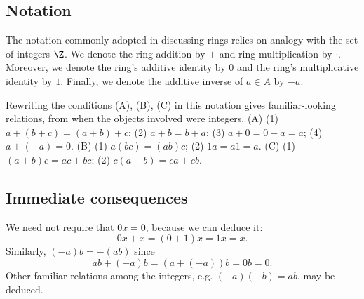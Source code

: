 \subsection*{Notation}

The notation commonly adopted in discussing rings relies on analogy with the set of integers $\Z $.
We denote the ring addition by $+$ and ring multiplication by $\cdot $.
Moreover, we denote the ring's additive identity by $0$ and the ring's multiplicative identity by $1$.
Finally, we denote the additive inverse of $a \in A$ by $-a$.

Rewriting the conditions (A), (B), (C) in this notation gives familiar-looking relations, from when the objects involved were integers.
(A) (1) $a+(b + c) = (a+b)+c$; (2) $a+b = b+a$; (3) $a + 0 = 0 + a = a$; (4) $a + (-a) = 0$.
(B) (1) $a(bc) = (ab)c$; (2) $1a = a1 = a$.
(C) (1) $(a+b)c = ac + bc$; (2) $c(a+b) = ca + cb$.

\subsection*{Immediate consequences}

We need not require that $0x = 0$, because we can deduce it:
\[
0x + x = (0 + 1)x = 1x = x.
\]
Similarly, $(-a)b = -(ab)$ since
\[
ab + (-a)b = (a + (-a))b = 0b = 0.
\]
Other familiar relations among the integers, e.g. $(-a)(-b) = ab$, may be deduced.
